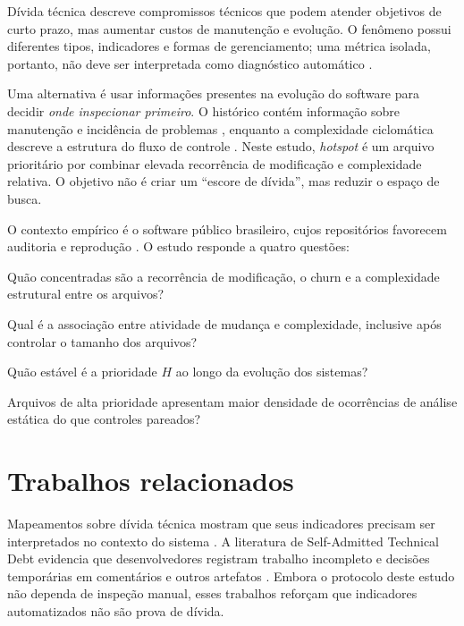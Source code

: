 \documentclass[12pt]{article}
\begin{document}
Dívida técnica descreve compromissos técnicos que podem atender objetivos de curto prazo, mas aumentar custos de manutenção e evolução. O fenômeno possui diferentes tipos, indicadores e formas de gerenciamento; uma métrica isolada, portanto, não deve ser interpretada como diagnóstico automático \cite{li2015mapping,alves2016identification}.

Uma alternativa é usar informações presentes na evolução do software para decidir \emph{onde inspecionar primeiro}. O histórico contém informação sobre manutenção e incidência de problemas \cite{graves2000changehistory,moser2008changemetrics}, enquanto a complexidade ciclomática descreve a estrutura do fluxo de controle \cite{mccabe1976complexity}. Neste estudo, \emph{hotspot} é um arquivo prioritário por combinar elevada recorrência de modificação e complexidade relativa. O objetivo não é criar um ``escore de dívida'', mas reduzir o espaço de busca.

O contexto empírico é o software público brasileiro, cujos repositórios favorecem auditoria e reprodução \cite{alves2009spb,pereira2019spb}. O estudo responde a quatro questões:

\begin{description}[leftmargin=1.3cm,style=nextline]
\item[RQ1.] Quão concentradas são a recorrência de modificação, o churn e a complexidade estrutural entre os arquivos?
\item[RQ2.] Qual é a associação entre atividade de mudança e complexidade, inclusive após controlar o tamanho dos arquivos?
\item[RQ3.] Quão estável é a prioridade $H$ ao longo da evolução dos sistemas?
\item[RQ4.] Arquivos de alta prioridade apresentam maior densidade de ocorrências de análise estática do que controles pareados?
\end{description}

\section{Trabalhos relacionados}

Mapeamentos sobre dívida técnica mostram que seus indicadores precisam ser interpretados no contexto do sistema \cite{li2015mapping,alves2016identification}. A literatura de Self-Admitted Technical Debt evidencia que desenvolvedores registram trabalho incompleto e decisões temporárias em comentários e outros artefatos \cite{potdar2014satd,li2023satd}. Embora o protocolo deste estudo não dependa de inspeção manual, esses trabalhos reforçam que indicadores automatizados não são prova de dívida.
\end{document}
